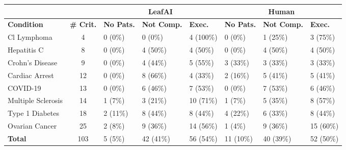 \def\arraystretch{1.4}
\begin{tabular}{l c |l l l| l l l}
     & & \multicolumn{3}{c}{\textbf{LeafAI}} & \multicolumn{3}{|c}{\textbf{Human}}  \\
    \toprule
    \textbf{Condition} & \textbf{\# Crit.} & \textbf{No Pats.} & \textbf{Not Comp.} & \textbf{Exec.} & \textbf{No Pats.} & \textbf{Not Comp.} & \textbf{Exec.} \\
    \toprule
    Cl Lymphoma        & 4  & 0 (0\%)    & 0 (0\%)   & 4  (100\%) & 0 (0\%)   & 1 (25\%)  & 3 (75\%) \\
    Hepatitis C        & 8  & 0 (0\%)    & 4 (50\%)  & 4  (50\%)  & 0 (0\%)   & 4 (50\%)  & 4 (50\%) \\
    Crohn's Disease    & 9  & 0 (0\%)    & 4 (44\%)  & 5  (55\%)  & 3 (33\%)  & 3 (33\%)  & 3 (33\%) \\
    Cardiac Arrest     & 12 & 0 (0\%)    & 8 (66\%)  & 4  (33\%)  & 2 (16\%)  & 5 (41\%)  & 5 (41\%) \\
    COVID-19           & 13 & 0 (0\%)    & 6 (46\%)  & 7  (53\%)  & 0 (0\%)   & 7 (53\%)  & 6 (46\%) \\
    Multiple Sclerosis & 14 & 1 (7\%)    & 3 (21\%)  & 10 (71\%)  & 1 (7\%)   & 5 (35\%)  & 8 (57\%) \\
    Type 1 Diabetes    & 18 & 2 (11\%)   & 8 (44\%)  & 8  (44\%)  & 4 (22\%)  & 6 (33\%)  & 8 (44\%) \\
    Ovarian Cancer     & 25 & 2 (8\%)    & 9 (36\%)  & 14 (56\%)  & 1 (4\%)   & 9 (36\%)  & 15 (60\%) \\
    \bottomrule
    \textbf{Total}     & 103 & 5 (5\%)   & 42 (41\%) & 56 (54\%)  & 11 (10\%) & 40 (39\%) & 52 (50\%) \\
\end{tabular}